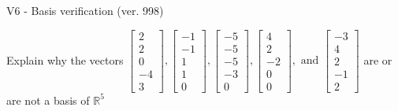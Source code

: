 \begin{exercise}
  \begin{exerciseTitle}V6 - Basis verification (ver. 998)\end{exerciseTitle}
  \begin{exerciseStatement}
    Explain why the vectors \(\left[\begin{array}{r}
2 \\
2 \\
0 \\
-4 \\
3
\end{array}\right] , \left[\begin{array}{r}
-1 \\
-1 \\
1 \\
1 \\
0
\end{array}\right] , \left[\begin{array}{r}
-5 \\
-5 \\
-5 \\
-3 \\
0
\end{array}\right] , \left[\begin{array}{r}
4 \\
2 \\
-2 \\
0 \\
0
\end{array}\right] , \text{ and } \left[\begin{array}{r}
-3 \\
4 \\
2 \\
-1 \\
2
\end{array}\right]\) are or are not a basis of \(\mathbb{R}^5\)	



\end{exerciseStatement}
\end{exercise}
